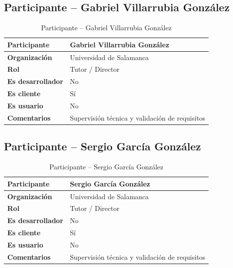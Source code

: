 \documentclass[11pt, a4paper]{article}
\begin{document}
\subsection{Participante -- Gabriel Villarrubia González}

\begin{table}[H]
    \centering
    \small
    \begin{tabular}{|p{4cm}|p{10cm}|}
    \hline
    \textbf{Participante} & Gabriel Villarrubia González \\
    \hline
    \textbf{Organización} & Universidad de Salamanca \\
    \hline
    \textbf{Rol} & Tutor / Director \\
    \hline
    \textbf{Es desarrollador} & No \\
    \hline
    \textbf{Es cliente} & Sí \\
    \hline
    \textbf{Es usuario} & No \\
    \hline
    \textbf{Comentarios} & Supervisión técnica y validación de requisitos \\
    \hline
    \end{tabular}
    \caption{Participante -- Gabriel Villarrubia González}
\end{table}

\subsection{Participante -- Sergio García González}

\begin{table}[H]
    \centering
    \small
    \begin{tabular}{|p{4cm}|p{10cm}|}
    \hline
    \textbf{Participante} & Sergio García González \\
    \hline
    \textbf{Organización} & Universidad de Salamanca \\
    \hline
    \textbf{Rol} & Tutor / Director \\
    \hline
    \textbf{Es desarrollador} & No \\
    \hline
    \textbf{Es cliente} & Sí \\
    \hline
    \textbf{Es usuario} & No \\
    \hline
    \textbf{Comentarios} & Supervisión técnica y validación de requisitos \\
    \hline
    \end{tabular}
    \caption{Participante -- Sergio García González}
\end{table}
\end{document}
